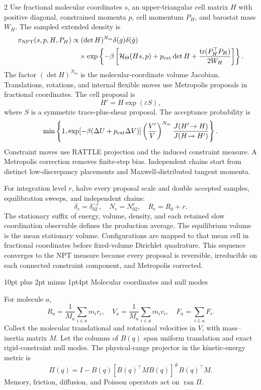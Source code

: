 \documentclass[10pt]{article}
\makeatletter
\renewcommand\section{\@startsection{section}{1}{0pt}%
  {10pt plus 2pt minus 1pt}{4pt}%
  {\large\sffamily\bfseries\color{lithioxfontgreen}}}
\newcommand{\tr}{\operatorname{tr}}
\newcommand{\pinv}{^{\#}}
\makeatother
\begin{document}
\begin{multicols}{2}
Use fractional molecular coordinates \(s\), an upper-triangular cell matrix \(H\)
with positive diagonal, constrained momenta \(p\), cell momentum \(P_H\), and
barostat mass \(W_H\).  The sampled extended density is
\[
\begin{aligned}
\pi_{\rm NPT}(s,p,H,P_H)
&\propto(\det H)^{N_m}\delta(g)\delta(\dot g)\\
&\quad{}\times
\exp\left\{-\beta\left[
\mathcal H_\Theta(Hs,p)+p_{\rm ext}\det H+
\frac{\tr(P_H^\top P_H)}{2W_H}
\right]\right\}.
\end{aligned}
\]
The factor \((\det H)^{N_m}\) is the molecular-coordinate volume Jacobian.
Translations, rotations, and internal flexible moves use Metropolis proposals in
fractional coordinates.  The cell proposal is
\[
H'=H\exp(\varepsilon S),
\]
where \(S\) is a symmetric trace-plus-shear proposal.  The acceptance probability
is
\[
\min\left\{1,
\exp[-\beta(\Delta U+p_{\rm ext}\Delta V)]
\left(\frac{V'}{V}\right)^{N_m}
\frac{J(H'\!\to H)}{J(H\!\to H')}
\right\}.
\]
Constraint moves use RATTLE projection and the induced constraint measure.  A
Metropolis correction removes finite-step bias.  Independent chains start from
distinct low-discrepancy placements and Maxwell-distributed tangent momenta.

For integration level \(r\), halve every proposal scale and double accepted
samples, equilibration sweeps, and independent chains:
\[
\delta_r=\delta_02^{-r},\quad
N_r=N_02^r,\quad
R_r=R_0+r.
\]
The stationary suffix of energy, volume, density, and each retained slow
coordination observable defines the production average.  The equilibrium volume
is the mean stationary volume.  Configurations are mapped to that mean cell in
fractional coordinates before fixed-volume Dirichlet quadrature.  This sequence
converges to the NPT measure because every proposal is reversible, irreducible on
each connected constraint component, and Metropolis corrected.

\section{Molecular coordinates and null modes}

For molecule \(a\),
\[
R_a=\frac{1}{M_a}\sum_{i\in a}m_ir_i,\quad
V_a=\frac{1}{M_a}\sum_{i\in a}m_iv_i,\quad
F_a=\sum_{i\in a}F_i.
\]
Collect the molecular translational and rotational velocities in \(V\), with
mass--inertia matrix \(M\). Let the columns of \(B(q)\) span uniform translation and
exact rigid-constraint null modes. The physical-range projector in the kinetic-energy
metric is
\[
\boxed{\Pi(q)=I-B(q)\left[B(q)^\top M B(q)\right]\pinv B(q)^\top M.}
\]
Memory, friction, diffusion, and Poisson operators act on \(\operatorname{ran}\Pi\).


\end{multicols}
\end{document}
